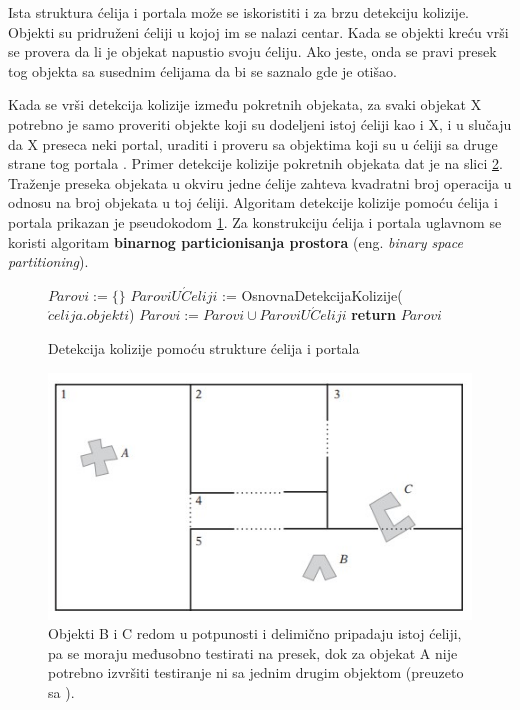 \documentclass[12pt,oneside]{memoir}
\begin{document}
Ista struktura ćelija i portala može se iskoristiti i za brzu detekciju kolizije. 
Objekti su pridruženi ćeliji u kojoj im se nalazi centar. Kada se objekti kreću vrši 
se provera da li je objekat napustio svoju ćeliju. Ako jeste, onda se pravi presek tog objekta
sa susednim ćelijama da bi se saznalo gde je otišao. 

Kada se vrši detekcija kolizije između pokretnih objekata, za svaki objekat X 
potrebno je samo proveriti objekte koji su dodeljeni istoj ćeliji kao i X, i u slučaju
da X preseca neki portal, uraditi i proveru sa objektima koji su u ćeliji sa druge strane tog portala \cite{cells}.
Primer detekcije kolizije pokretnih objekata dat je na slici \ref{fig:cellsObj}.
Traženje preseka objekata u okviru jedne ćelije zahteva kvadratni broj operacija u odnosu na broj objekata u toj ćeliji.
Algoritam detekcije kolizije pomoću ćelija i portala prikazan je pseudokodom \ref{alg:cell}.
Za konstrukciju ćelija i portala uglavnom se koristi algoritam 
\textbf{binarnog particionisanja prostora} (eng. {\em binary space partitioning}).

\begin{figure}[!h]
    \label{alg:cell}
	\begin{algorithmic}[1]
		\State $Parovi := \{ \}$
			\State $ParoviU\acute{C}eliji$ := OsnovnaDetekcijaKolizije($\acute{c}elija.objekti$)
			\State $Parovi:=Parovi \cup ParoviU\acute{C}eliji$
		\EndFor
		\State \textbf{return} $Parovi$
		\EndProcedure
	\end{algorithmic}
	\caption{Detekcija kolizije pomoću strukture ćelija i portala}
\end{figure}

\begin{figure}[h!]
	\centering
	\includegraphics[scale=1]{cellsObj.jpg}
	\caption{ Objekti B i C redom u potpunosti i delimično pripadaju istoj ćeliji, pa se moraju međusobno testirati na presek,
	 dok za objekat A nije potrebno izvršiti testiranje ni sa jednim drugim objektom (\tiny preuzeto sa \cite{glavnaKnjiga}). }
	
	\label{fig:cellsObj}
\end{figure}
\end{document}
